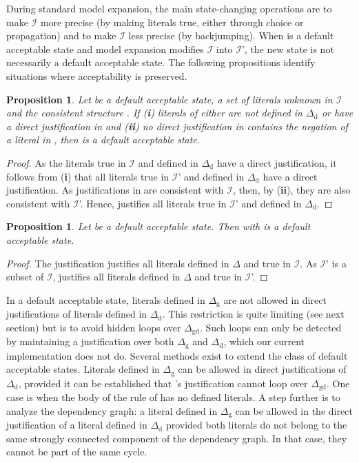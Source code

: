 \documentclass[11pt]{article}
\newcommand{\m}[1]{\ensuremath{#1}\xspace}
\newcommand{\I}{\m{\mathcal{I}}}
\newcommand{\D}{\m{\Delta}}
\theoremstyle{plain}
\newtheorem{proposition}[thm]{Proposition}
\theoremstyle{definition}
\theoremstyle{example_basic}
\theoremstyle{example_contd}
\theoremstyle{plain}
\newcommand{\Dg}{\ensuremath{\D_\text{g}}\xspace}
\newcommand{\Dd}{\ensuremath{\D_\text{d}}\xspace}
\newcommand{\Dgd}{\ensuremath{\D_\text{gd}}\xspace}
\newcommand{\tbf}[1]{\textbf{#1}}
\newcommand{\change}[1]{#1}
\begin{document}
\change{During standard model expansion, the main state-changing operations are to make \I more precise (by making literals true, either through choice or propagation) and to make \I less precise (by backjumping).} When  is a default acceptable state and model expansion modifies \I into \I', the new state  is not necessarily a default acceptable state. The following propositions identify situations where acceptability is preserved.

\begin{proposition}\label{prop:forward}
  Let  be a default acceptable state,  a set of literals unknown in \I and  the consistent structure . If (\tbf{i}) literals of  either are not defined in \Dd or have a direct justification in \jgraph and (\tbf{ii}) no direct justification in \jgraph contains the negation of a literal in , then  is a default acceptable state.
\end{proposition}
\begin{proof}
  As the literals true in \I and defined in \Dd have a direct justification, it follows from (\tbf{i}) that all literals true in \I' and defined in \Dd have a direct justification. As justifications in \jgraph are consistent with \I, then, by (\tbf{ii}), they are also consistent with \I'. Hence, \jgraph justifies all literals true in \I' and defined in \Dd.
\end{proof}


\begin{proposition}\label{prop:backward}
  Let  be a default acceptable state.
  Then  with  is a
  default acceptable state.
\end{proposition}

\begin{proof}
  The justification \jgraph justifies all literals defined in
  \D and true in \I. As \I' is a subset of \I, \jgraph
  justifies all literals defined in \D and true in \I'.
\end{proof}

\change{In a default acceptable state,  literals defined in \Dg are not allowed in direct justifications of  literals defined in \Dd. This restriction is quite limiting (see next section) but is to avoid hidden loops over \Dgd. Such loops can only be detected by  maintaining a justification over both \Dg and \Dd, which our current implementation does not do. 
Several methods exist to extend the class of default acceptable states. Literals  defined in \Dg can be allowed in direct justifications of \Dd, provided it can be established that 's justification cannot loop over \Dgd. One case is when the body of the rule of   has no defined literals. A step further is to analyze the dependency graph: a literal  defined in \Dg can be allowed in the direct justification of a literal defined in \Dd provided both literals do not belong to the same strongly connected component of the dependency graph. In that case, they cannot be part of the same cycle.}
\end{document}
